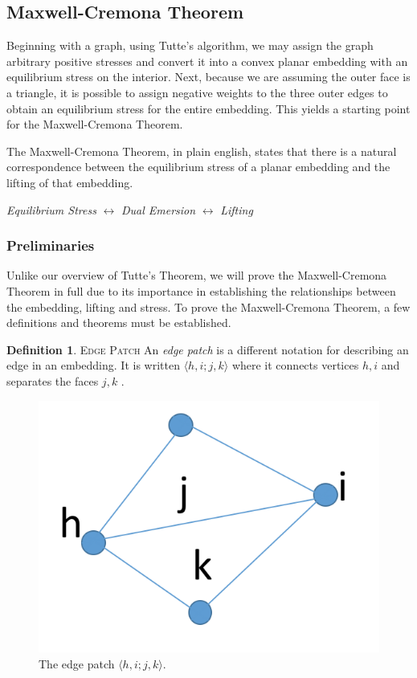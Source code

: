 \documentclass[11pt]{article}
\theoremstyle{definition}
\newtheorem{definition}{Definition}[section]
\begin{document}
	
\subsection{Maxwell-Cremona Theorem}
	Beginning with a graph, using Tutte's algorithm, we may assign the graph arbitrary positive stresses and convert it into a convex planar embedding with an equilibrium stress on the interior. 
	Next, because we are assuming the outer face is a triangle, it is possible to assign negative weights to the three outer edges to obtain an equilibrium stress for the entire embedding. 
	This yields a starting point for the Maxwell-Cremona Theorem.

 	The Maxwell-Cremona Theorem, in plain english, states that there is a natural correspondence between the equilibrium stress of a planar embedding and the lifting of that embedding.
 
 
 	\emph{Equilibrium Stress} $\leftrightarrow$ \emph{Dual Emersion} $\leftrightarrow$ \emph{Lifting}
	
	\subsubsection{Preliminaries}
	Unlike our overview of Tutte's Theorem, we will prove the Maxwell-Cremona Theorem in full due to its importance in establishing the relationships between the embedding, lifting and stress. 
	To prove the Maxwell-Cremona Theorem, a few definitions and theorems must be established. 
	\theoremstyle{definition}
	\begin{definition}{\textsc{Edge Patch}}
		An \emph{edge patch} is a different notation for describing an edge in an embedding. 
		It is written $\langle h,i;j,k \rangle$ where it connects vertices $h,i$ and separates the faces $j,k$ \cite{mccProof}.
	\end{definition}
	
		\begin{figure}[h]
  		\begin{center}
  			\includegraphics[width=.3\textwidth]{edge_patch2}
  		\end{center}
  		\caption{The edge patch $\langle h,i;j,k \rangle$.}
	\end{figure}
	
\end{document}
